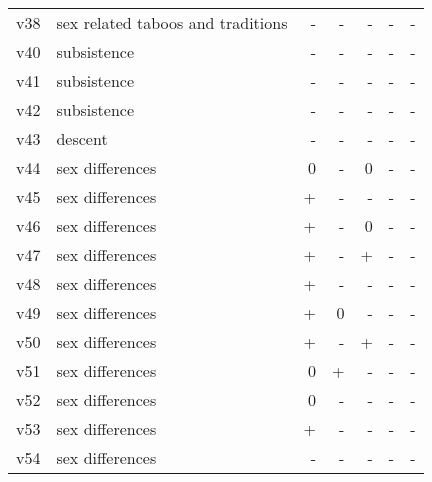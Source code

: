 \documentclass[12pt, a4paper]{article}
\begin{document}
\begin{table}
{\begin{tabular}{llrrrrr}
    v38 & sex related taboos and traditions & \cellcolor{myred} - & \cellcolor{myred} - & \cellcolor{myred} - & \cellcolor{myred} - & \cellcolor{myred} -\\
    v40 & subsistence & \cellcolor{myred} - & \cellcolor{myred} - & \cellcolor{myred} - & \cellcolor{myred} - & \cellcolor{myred} -\\
    v41 & subsistence & \cellcolor{myred} - & \cellcolor{myred} - & \cellcolor{myred} - & \cellcolor{myred} - & \cellcolor{myred} -\\
    v42 & subsistence & \cellcolor{myred} - & \cellcolor{myred} - & \cellcolor{myred} - & \cellcolor{myred} - & \cellcolor{myred} -\\
    v43 & descent & \cellcolor{myred} - & \cellcolor{myred} - & \cellcolor{myred} - & \cellcolor{myred} - & \cellcolor{myred} -\\
    v44 & sex differences & 0 & \cellcolor{myred} - & 0 & \cellcolor{myred} - & \cellcolor{myred} -\\
    v45 & sex differences & \cellcolor{myblue} + & \cellcolor{myred} - & \cellcolor{myred} - & \cellcolor{myred} - & \cellcolor{myred} -\\
    v46 & sex differences & \cellcolor{myblue} + & \cellcolor{myred} - & 0 & \cellcolor{myred} - & \cellcolor{myred} -\\
    v47 & sex differences & \cellcolor{myblue} + & \cellcolor{myred} - & \cellcolor{myblue} + & \cellcolor{myred} - & \cellcolor{myred} -\\
    v48 & sex differences & \cellcolor{myblue} + & \cellcolor{myred} - & \cellcolor{myred} - & \cellcolor{myred} - & \cellcolor{myred} -\\
    v49 & sex differences & \cellcolor{myblue} + & 0 & \cellcolor{myred} - & \cellcolor{myred} - & \cellcolor{myred} -\\
    v50 & sex differences & \cellcolor{myblue} + & \cellcolor{myred} - & \cellcolor{myblue} + & \cellcolor{myred} - & \cellcolor{myred} -\\
    v51 & sex differences & 0 & \cellcolor{myblue} + & \cellcolor{myred} - & \cellcolor{myred} - & \cellcolor{myred} -\\
    v52 & sex differences & 0 & \cellcolor{myred} - & \cellcolor{myred} - & \cellcolor{myred} - & \cellcolor{myred} -\\
    v53 & sex differences & \cellcolor{myblue} + & \cellcolor{myred} - & \cellcolor{myred} - & \cellcolor{myred} - & \cellcolor{myred} -\\
    v54 & sex differences & \cellcolor{myred} - & \cellcolor{myred} - & \cellcolor{myred} - & \cellcolor{myred} - & \cellcolor{myred} -\\

\end{tabular}}
\end{table}
\end{document}
